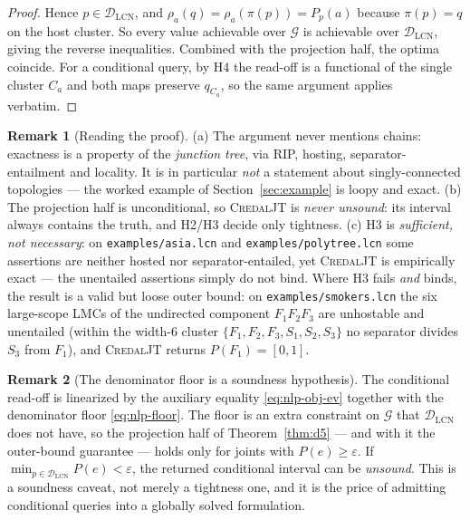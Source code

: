 \documentclass[11pt]{article}
\theoremstyle{definition}
\newtheorem{remark}{Remark}
\newcommand{\DLCN}{\mathcal{D}_{\mathrm{LCN}}}
\newcommand{\readoff}{\rho}
\begin{document}
\begin{proof}
Hence $p\in\DLCN$, and $\readoff_a(q)=\readoff_a(\pi(p))=P_p(a)$ because
$\pi(p)=q$ on the host cluster. So every value achievable over $\mathcal G$ is
achievable over $\DLCN$, giving the reverse inequalities. Combined with the
projection half, the optima coincide. For a conditional query, by H4 the read-off
is a functional of the single cluster $C_a$ and both maps preserve $q_{C_a}$, so
the same argument applies verbatim.
\end{proof}

\begin{remark}[Reading the proof]\label{rem:d5reading}
(a) The argument never mentions chains: exactness is a property of the
\emph{junction tree}, via RIP, hosting, separator-entailment and locality. It is
in particular \emph{not} a statement about singly-connected topologies --- the
worked example of Section~\ref{sec:example} is loopy and exact.
(b) The projection half is unconditional, so \textsc{CredalJT} is \emph{never
unsound}: its interval always contains the truth, and H2/H3 decide only
tightness. (c) H3 is \emph{sufficient, not necessary}: on
\texttt{examples/asia.lcn} and \texttt{examples/polytree.lcn} some assertions are
neither hosted nor separator-entailed, yet \textsc{CredalJT} is empirically exact
--- the unentailed assertions simply do not bind. Where H3 fails \emph{and}
binds, the result is a valid but loose outer bound: on
\texttt{examples/smokers.lcn} the six large-scope LMCs of the undirected
component $F_1F_2F_3$ are unhostable and unentailed (within the width-$6$ cluster
$\{F_1,F_2,F_3,S_1,S_2,S_3\}$ no separator divides $S_3$ from $F_1$), and
\textsc{CredalJT} returns $P(F_1)=[0,1]$.
\end{remark}

\begin{remark}[The denominator floor is a soundness hypothesis]\label{rem:denfloor}
The conditional read-off is linearized by the auxiliary equality
\eqref{eq:nlp-obj-ev} together with the denominator floor \eqref{eq:nlp-floor}.
The floor is an extra constraint on $\mathcal G$ that $\DLCN$ does not have, so
the projection half of Theorem~\ref{thm:d5} --- and with it the outer-bound
guarantee --- holds only for joints with $P(e)\ge\varepsilon$. If
$\min_{p\in\DLCN}P(e)<\varepsilon$, the returned conditional interval can be
\emph{unsound}. This is a soundness caveat, not merely a tightness one, and it is
the price of admitting conditional queries into a globally solved formulation.
\end{remark}
\end{document}

